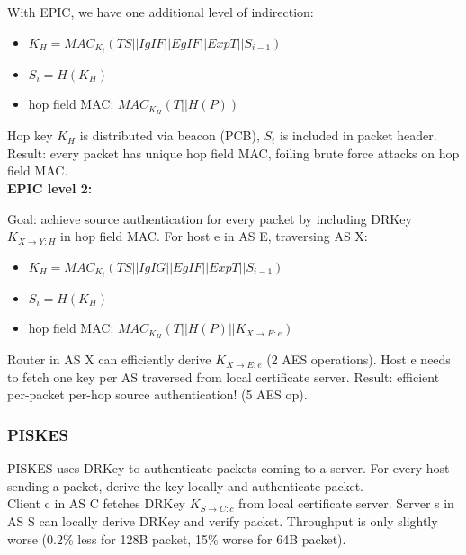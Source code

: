 \documentclass[11pt,oneside,a4paper]{article}
\begin{document}
With EPIC, we have one additional level of indirection:

\vspace{-\topsep}
\begin{itemize}
	\setlength{\itemsep}{0pt}
	\setlength{\parskip}{0pt}
	\item $K_H = MAC_{K_i}(TS||IgIF||EgIF||ExpT||S_{i-1})$
	\item $S_i = H(K_H)$
	\item hop field MAC: $MAC_{K_H}(T||H(P))$
\end{itemize}
\vspace{-\topsep}

Hop key $K_H$ is distributed via beacon (PCB), $S_i$ is included in packet header. Result: every packet has unique hop field MAC, foiling brute force attacks on hop field MAC.\\

\textbf{EPIC level 2:}

Goal: achieve source authentication for every packet by including DRKey $K_{X\rightarrow Y:H}$ in hop field MAC. For host e in AS E, traversing AS X:

\vspace{-\topsep}
\begin{itemize}
	\setlength{\itemsep}{0pt}
	\setlength{\parskip}{0pt}
	\item $K_H = MAC_{K_i}(TS||IgIG||EgIF||ExpT||S_{i-1})$
	\item $S_i = H(K_H)$
	\item hop field MAC: $MAC_{K_H}(T||H(P)||K_{X \rightarrow E:e})$
\end{itemize}
\vspace{-\topsep}

Router in AS X can efficiently derive $K_{X \rightarrow E:e}$ (2 AES operations). Host e needs to fetch one key per AS traversed from local certificate server. Result: efficient per-packet per-hop source authentication! (5 AES op).


\subsubsection{PISKES}

PISKES uses DRKey to authenticate packets coming to a server. For every host sending a packet, derive the key locally and authenticate packet.\\
Client c in AS C fetches DRKey $K_{S \rightarrow C:c}$ from local certificate server. Server s in AS S can locally derive
DRKey and verify packet. Throughput is only slightly worse (0.2\% less for 128B packet, 15\% worse for 64B packet).
\end{document}
